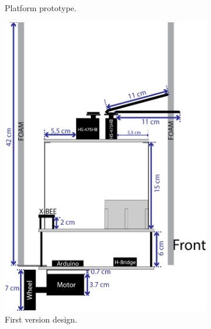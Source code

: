 \begin{figure}[h]
\begin{subfigure}[c]{0.3\textwidth}
	\caption{Platform prototype.}
	\label{fig:triskar-prototype}
	\end{subfigure}
	\begin{subfigure}[c]{0.3\textwidth}
	\centering
	\includegraphics[width=\textwidth]{./Images/upperSecondC.png}
	\caption{First version design.}
	\label{fig:triskar-first-design}
	\end{subfigure}
	\\
	\begin{subfigure}[c]{0.3\textwidth}
	\centering

\end{subfigure}
\end{figure}
